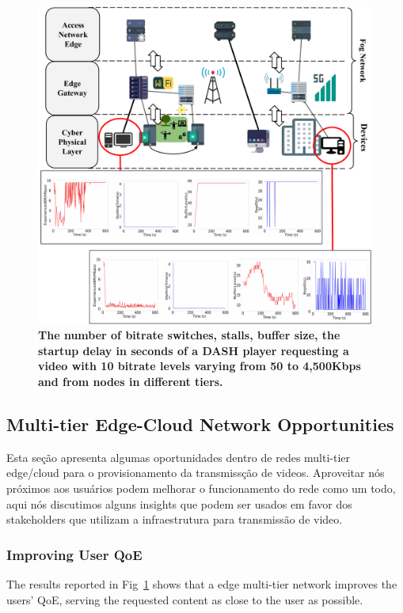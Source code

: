 \begin{figure}
    \centering
    \includegraphics[width=0.9\linewidth]{images/qoe-multi-level.pdf}
    \caption{\textbf{The number of bitrate switches, stalls, buffer size, the startup delay in seconds of a DASH player requesting a video with 10 bitrate levels varying from 50 to 4,500Kbps and from nodes in different tiers.}}
    \label{fig:impact-two-layers}
\end{figure}


\subsection{Multi-tier Edge-Cloud Network Opportunities}

Esta seção apresenta algumas oportunidades dentro de redes multi-tier edge/cloud para o provisionamento da transmissção de videos. Aproveitar nós próximos aos usuários podem melhorar o funcionamento do rede como um todo, aqui nós discutimos alguns insights que podem ser usados em favor dos stakeholders que utilizam a infraestrutura para transmissão de video. 


\subsubsection{Improving User QoE}

The results reported in Fig~\ref{fig:impact-two-layers} shows that a edge multi-tier network improves the users' QoE, serving the requested content as close to the user as possible. 

